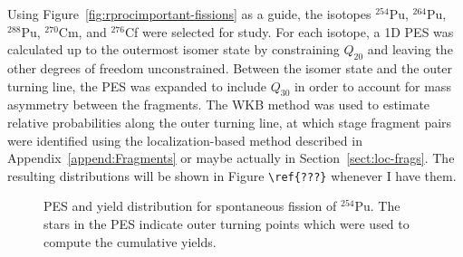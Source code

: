 Using Figure~\ref{fig:rprocimportant-fissions} as a guide, the isotopes $^{254}$Pu, $^{264}$Pu, $^{288}$Pu, $^{270}$Cm, and $^{276}$Cf were selected for study. For each isotope, a 1D PES was calculated up to the outermost isomer state by constraining $Q_{20}$ and leaving the other degrees of freedom unconstrained. Between the isomer state and the outer turning line, the PES was expanded to include $Q_{30}$ in order to account for mass asymmetry between the fragments. The WKB method was used to estimate relative probabilities along the outer turning line, at which stage fragment pairs were identified using the localization-based method described in Appendix~\ref{append:Fragments} or maybe actually in Section~\ref{sect:loc-frags}. The resulting distributions will be shown in Figure \verb|\ref{???}| whenever I have them.

\begin{figure}%
	\centering
	\qquad
	\caption{PES and yield distribution for spontaneous fission of $^{254}$Pu. The stars in the PES indicate outer turning points which were used to compute the cumulative yields.}%
	\label{fig:254Pu-yield}%
\end{figure}

